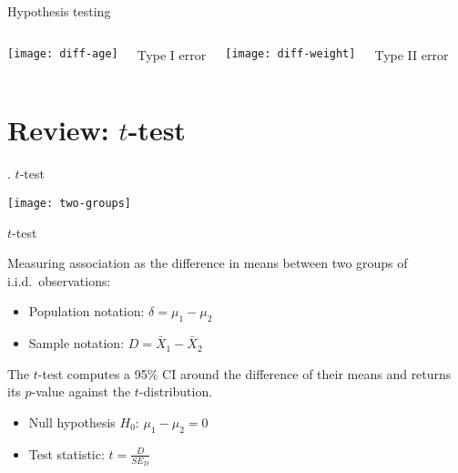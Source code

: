 \documentclass[t]{beamer}
\begin{document}

	\begin{frame}[c]{Hypothesis testing}
		
		\begin{columns}[c]
			\texttt{[image: diff-age]}
			
			\begin{center}
				Type I error
			\end{center}

			\texttt{[image: diff-weight]}

			\begin{center}
				Type II error
			\end{center}
		\end{columns}
		
	\end{frame}


	\section{Review: $t$-test}

	
	\begin{frame}[c]{\thesection. $t$-test}

		\texttt{[image: two-groups]}

	\end{frame}
		
	\begin{frame}{$t$-test}
		
		\begin{block}{Measuring association as the difference in means between two groups of i.i.d.~observations:}
		
			\begin{itemize}
				\item Population notation:
				$\delta = \mu_1 - \mu_2$

				\item Sample notation:
				$D = \bar X_1 - \bar X_2$
			\end{itemize}

		\end{block}
		
		\begin{block}{The $t$-test computes a 95\% CI around the difference of their means and returns its $p$-value against the $t$-distribution.}
		
			\begin{itemize}
				\item Null hypothesis $H_0$:
				$\mu_1 - \mu_2 = 0$
			
				\item Test statistic:
				$t = \frac{D}{SE_D}$
			\end{itemize}

		\end{block}
		
	\end{frame}
\end{document}
